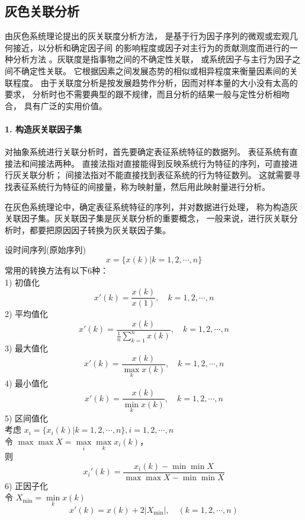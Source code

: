 \subsection{灰色关联分析}
由灰色系统理论提出的灰关联度分析方法，
是基于行为因子序列的微观或宏观几何接近，以分析和确定因子间
的影响程度或因子对主行为的贡献测度而进行的一种分析方法
。灰联度是指事物之间的不确定性关联，
或系统因子与主行为因子之间不确定性关联。
它根据因素之间发展态势的相似或相异程度来衡量因素间的关联程度。
由于关联度分析是按发展趋势作分析，因而对样本量的大小没有太高的要求，
分析时也不需要典型的跟不规律，而且分析的结果一般与定性分析相吻合，
具有广泛的实用价值。
\paragraph*{1. 构造灰关联因子集}
对抽象系统进行关联分析时，首先要确定表征系统特征的数据列。
表征系统有直接法和间接法两种。
直接法指对直接能得到反映系统行为特征的序列，可直接进行灰关联分析；
间接法指对不能直接找到表征系统的行为特征数列。
这就需要寻找表征系统行为特征的间接量，称为映射量，然后用此映射量进行分析。

在灰色系统理论中，确定表征系统特征的序列，并对数据进行处理，
称为构造灰关联因子集。灰关联因子集是灰关联分析的重要概念，
一般来说，进行灰关联分析时，都要把原因因子转换为灰关联因子集。

设时间序列(原始序列)
\begin{equation}
x=\{x(k)|k=1,2, \cdots ,n\}
\end{equation}
常用的转换方法有以下6种： \\
1) 初值化
\begin{equation}
x'(k)=\frac{x(k)}{x(1)}, \quad k=1,2, \cdots, n
\end{equation}
2) 平均值化
\begin{equation}
x'(k)=\frac{x(k)}{\frac{1}{n} \sum_{k=1}^n x(k)}, \quad k=1,2, \cdots, n
\end{equation}
3) 最大值化
\begin{equation}
x'(k)=\frac{x(k)}{\underset{k}{\max} x(k)}, \quad k=1,2, \cdots, n
\end{equation}
4) 最小值化
\begin{equation}
x'(k)=\frac{x(k)}{\underset{k}{\min} x(k)}, \quad k=1,2, \cdots, n
\end{equation}
5) 区间值化 \\
考虑 $x_i=\{x_i(k)|k=1,2, \cdots ,n\}, i=1,2, \cdots ,n$ \\
令 $\max\max X=\underset{i}{\max} \underset{k}{\max} x_i(k)$，\\
则
\begin{equation}
x_i'(k)=\frac{x_i(k)-\min\min X}{\max\max X - \min\min X}
\end{equation}
6) 正因子化 \\
令 $X_{\min}=\underset{k}{\min}x(k)$
\begin{equation}
x'(k)=x(k)+2|X_{\min}|, \quad (k=1,2, \cdots, n)
\end{equation}

